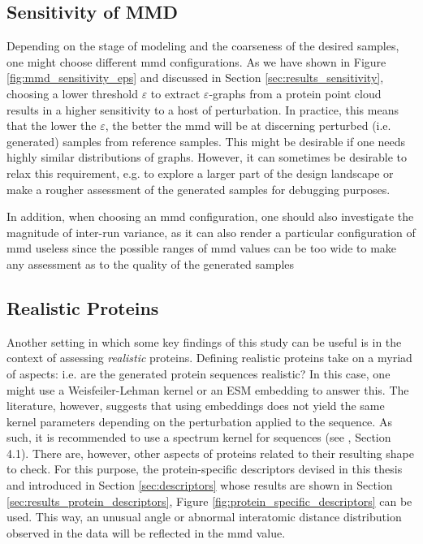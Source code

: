 \subsection{Sensitivity of MMD}\label{sec:discussion_right_mmd}
Depending on the stage of modeling and the coarseness of the desired samples,
one might choose different \acrshort{mmd} configurations. As we have shown in Figure
\ref{fig:mmd_sensitivity_eps} and discussed in Section
\ref{sec:results_sensitivity}, choosing a lower threshold $\varepsilon$ to
extract $\varepsilon$-graphs from a protein point cloud results in a higher
sensitivity to a host of perturbation. In practice, this means that the lower the
$\varepsilon$, the better the \acrshort{mmd} will be at discerning perturbed (i.e.
generated) samples from reference samples. This might be desirable if one needs
highly similar distributions of graphs. However, it can sometimes be desirable
to relax this requirement, e.g. to explore a larger part of the design landscape
or make a rougher assessment of the generated samples for debugging purposes.

In addition, when choosing an \acrshort{mmd} configuration, one should also investigate the
magnitude of inter-run variance, as it can also render a particular
configuration of \acrshort{mmd} useless since the possible ranges of \acrshort{mmd} values can be too
wide to make any assessment as to the quality of the generated samples

\subsection{Realistic Proteins}\label{sec:discussion_realistic_proteins}

Another setting in which some key findings of this study can be useful is in the
context of assessing \emph{realistic} proteins. Defining realistic proteins take on a
myriad of aspects: i.e. are the generated protein sequences realistic? In this
case, one might use a Weisfeiler-Lehman kernel or an ESM embedding to answer
this. The literature, however, suggests that using embeddings does not yield the
same kernel parameters depending on the perturbation applied to the sequence. As
such, it is recommended to use a spectrum kernel \citep{leslie2001spectrum} for
sequences (see \cite{kucera2021conditional}, Section 4.1). There are, however,
other aspects of proteins related to their resulting shape to check. For this
purpose, the protein-specific descriptors devised in this thesis and introduced in
Section \ref{sec:descriptors} whose results are shown in Section
\ref{sec:results_protein_descriptors}, Figure
\ref{fig:protein_specific_descriptors} can be used. This way, an unusual angle
or abnormal interatomic distance distribution observed in the data will be
reflected in the \acrshort{mmd} value.

